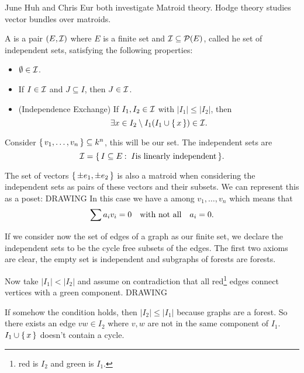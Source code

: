 \documentclass[12pt]{memoir}
\begin{document}
June Huh and Chris Eur both investigate Matroid theory. Hodge theory studies vector bundles over matroids.\par 

\begin{Def}
    A  is a pair $(E,\mathcal{I})$ where $E$ is a finite set and $\mathcal{I}\subseteq\mathcal{P}(E)$, called he set of independent sets, satisfying the following properties:
    \begin{itemize}
        \itemsep=-0.4em
        \item $\emptyset\in\mathcal{I}$.
        \item If $I\in\mathcal{I}$ and $J\subseteq I$, then $J\in\mathcal{I}$.
        \item (Independence Exchange) If $I_1,I_2\in\mathcal{I}$ with $|I_1|\leq |I_2|$, then 
        $$\exists x\in I_2\setminus I_1(I_1\cup\{\,x\,\})\in\mathcal{I}.$$
    \end{itemize} 
\end{Def}

\begin{Ex}
    Consider $\{\,v_1,\dots,v_n\,\}\subseteq k^n$, this will be our set. The independent sets are 
    $$\mathcal{I}=\{\,I\subseteq E\mathbin{:}\ I \text{is linearly independent}\,\}.$$
\end{Ex}

\begin{Ex}
The set of vectors $\{\,\pm e_1,\pm e_2\,\}$ is also a matroid when considering the independent sets as pairs of these vectors and their subsets. We can represent this as a poset: DRAWING
In this case we have a  among $v_1,\dots,v_n$ which means that 
$$\sum a_iv_i=0\quad\text{with not all}\quad a_i=0.$$
\end{Ex}

\begin{Ex}
    If we consider now the set of edges of a graph as our finite set, we declare the independent sets to be the cycle free subsets of the edges. The first two axioms are clear, the empty set is independent and subgraphs of forests are forests.\par 
    Now take $|I_1|<|I_2|$ and assume on contradiction that all red\footnote{red is $I_2$ and green is $I_1$.} edges connect vertices with a green component. DRAWING\par 
    If somehow the condition holds, then $|I_2|\leq |I_1|$ because graphs are a forest. So there exists an edge $vw\in I_2$ where $v,w$ are not in the same component of $I_1$. $I_1\cup\{\,x\,\}$ doesn't contain a cycle.
\end{Ex}
\end{document}
